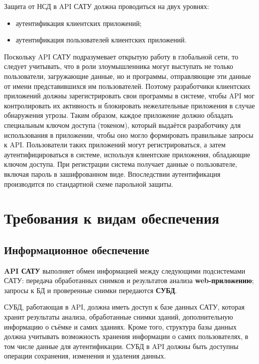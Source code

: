 	Защита от НСД в API САТУ должна проводиться на двух уровнях: 

	\begin{itemize}
		\item аутентификация клиентских приложений;
		\item аутентификация пользователей клиентских приложений.
	\end{itemize}
 
	Поскольку API САТУ подразумевает открытую работу в глобальной сети, то следует учитывать, что в роли злоумышленника могут выступать не только пользователи, загружающие данные, но и программы, отправляющие эти данные от имени представившихся им пользователей. Поэтому разработчики клиентских приложений должны зарегистрировать свои программы в системе, чтобы API мог контролировать их активность и блокировать нежелательные приложения в случае обнаружения угрозы. Таким образом, каждое приложение должно обладать специальным ключом доступа (токеном), который выдаётся разработчику для использования в приложении, чтобы оно могло формировать правильные запросы к API.
	Пользователи таких приложений могут регистрироваться, а затем аутентифицироваться в системе, используя клиентские приложения, обладающие ключом доступа. При регистрации система получает данные о пользователе, включая пароль в зашифрованном виде. Впоследствии аутентификация производится по стандартной схеме парольной защиты.

\section{\enskip Требования к видам обеспечения}

\subsection{\enskip Информационное обеспечение}

\par

	\textbf{API САТУ} выполняет обмен информацией между следующими подсистемами САТУ: передача обработанных снимков и результатов анализа \textbf{web-приложению}; запросы к БД и проверенные снимки передаются \textbf{СУБД}.
 
	СУБД, работающая в API, должна иметь доступ к базе данных САТУ, которая хранит результаты анализа, обработанные снимки зданий, дополнительную информацию о съёмке и самих зданиях. Кроме того, структура базы данных должна учитывать возможность хранения информации о самих пользователях, в том числе данные для аутентификации. СУБД в API должны быть доступны операции сохранения, изменения и удаления данных.
 
